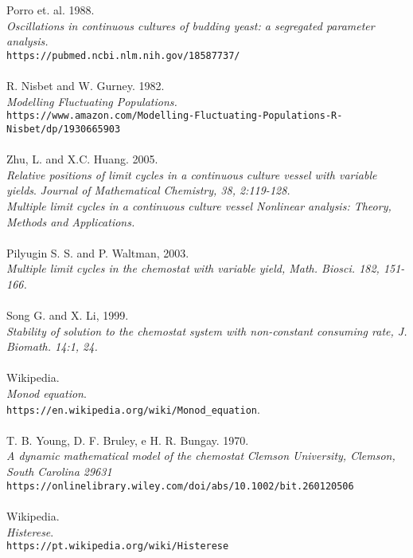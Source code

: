 \documentclass{article}
\begin{document}
\begin{thebibliography}{9}
Porro et. al. 1988.
\\
\textit{Oscillations in continuous cultures of budding yeast: a segregated parameter analysis.}
\\\texttt{https://pubmed.ncbi.nlm.nih.gov/18587737/}
\\\\
R. Nisbet and W. Gurney. 1982.
\\
\textit{Modelling Fluctuating Populations.}
\\\texttt{https://www.amazon.com/Modelling-Fluctuating-Populations-R-Nisbet/dp/1930665903}
\\\\
Zhu, L. and X.C. Huang. 2005.
\\
\textit{Relative positions of limit cycles in a continuous culture vessel with variable yields}.
\textit{Journal of Mathematical Chemistry, 38, 2:119-128.}
\\
\textit{Multiple limit cycles in a continuous culture vessel Nonlinear analysis: Theory, Methods and Applications.}
\\\\
Pilyugin S. S. and P. Waltman, 2003. 
\\
\textit{Multiple limit cycles in the chemostat with variable yield, Math. Biosci. 182, 151-166.}
\\\\
Song G. and X. Li, 1999. 
\\
\textit{Stability of solution to the chemostat system with non-constant consuming rate, J. Biomath. 14:1, 24.}
\\\\
Wikipedia.
\\
\textit{Monod equation}.
\\\texttt{https://en.wikipedia.org/wiki/Monod\_equation}.
\\\\
T. B. Young, D. F. Bruley, e H. R. Bungay. 1970.
\\
\textit{A dynamic mathematical model of the chemostat}
\textit{Clemson University, Clemson, South Carolina 29631}
\\\texttt{https://onlinelibrary.wiley.com/doi/abs/10.1002/bit.260120506}
\\\\
Wikipedia. 
\\
\textit{Histerese}. 
\\\texttt{https://pt.wikipedia.org/wiki/Histerese}

\end{thebibliography}
\end{document}
